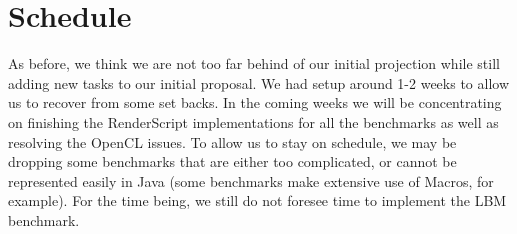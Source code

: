 
\section*{Schedule}

As before, we think we are not too far behind of our initial 
  projection while still adding new tasks to our initial proposal.
We had setup around 1-2 weeks to allow us to recover 
  from some set backs.
In the coming weeks we will be concentrating on finishing the 
  RenderScript implementations for all the benchmarks as well
  as resolving the OpenCL issues.
To allow us to stay on schedule, we may be dropping some benchmarks that
  are either too complicated, or cannot be represented easily in Java 
  (some benchmarks make extensive use of Macros, for example).
For the time being, we still do not foresee time to implement the LBM benchmark.
